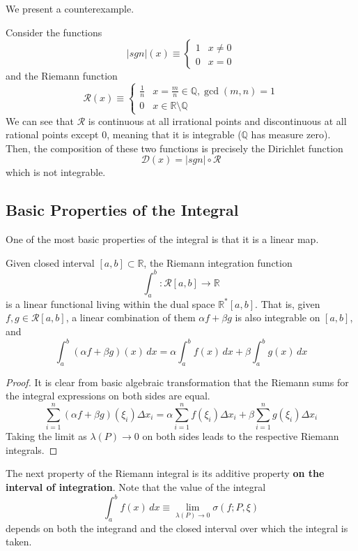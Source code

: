     We present a counterexample. 
    \begin{example}
    Consider the functions
    \[|sgn|(x) \equiv \begin{cases}
    1 & x \neq 0 \\
    0 & x = 0
    \end{cases}\]
    and the Riemann function 
    \[\mathcal{R}(x) \equiv \begin{cases}
    \frac{1}{n} & x = \frac{m}{n} \in \mathbb{Q}, \gcd(m, n) = 1 \\
    0 & x \in \mathbb{R} \setminus \mathbb{Q}
    \end{cases}\]
    We can see that $\mathcal{R}$ is continuous at all irrational points and discontinuous at all rational points except $0$, meaning that it is integrable ($\mathbb{Q}$ has measure zero). Then, the composition of these two functions is precisely the Dirichlet function
    \[\mathcal{D}(x) = |sgn| \circ \mathcal{R}\]
    which is not integrable. 
    \end{example}

  \subsection{Basic Properties of the Integral}

    One of the most basic properties of the integral is that it is a linear map. 
    \begin{lemma}
      Given closed interval $[a, b] \subset \mathbb{R}$, the Riemann integration function 
      \[\int_a^b: \mathcal{R}[a, b] \longrightarrow \mathbb{R}\]
      is a linear functional living within the dual space $\mathbb{R}^* [a, b]$. That is, given $f, g \in \mathcal{R}[a, b]$, a linear combination of them $\alpha f + \beta g$ is also integrable on $[a,b]$, and 
      \[\int_a^b (\alpha f + \beta g)(x)\,dx = \alpha \int_a^b f(x)\,dx + \beta \int_a^b g(x)\,dx\]
    \end{lemma}
    \begin{proof}
    It is clear from basic algebraic transformation that the Riemann sums for the integral expressions on both sides are equal. 
    \[\sum_{i=1}^n (\alpha f + \beta g) (\xi_i) \Delta x_i = \alpha \sum_{i=1}^n f(\xi_i) \Delta x_i + \beta \sum_{i=1}^n g(\xi_i) \Delta x_i\]
    Taking the limit as $\lambda(P) \rightarrow 0$ on both sides leads to the respective Riemann integrals. 
    \end{proof}


    The next property of the Riemann integral is its additive property \textbf{on the interval of integration}. Note that the value of the integral 
    \[\int_a^b f(x) \,dx \equiv \lim_{\lambda(P) \rightarrow 0} \sigma(f; P, \xi)\]
    depends on both the integrand and the closed interval over which the integral is taken. 

